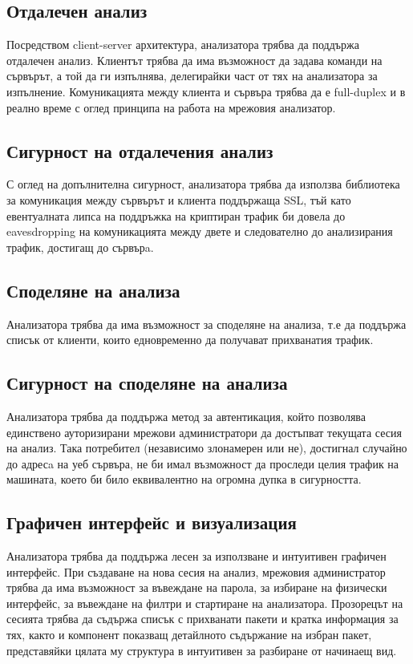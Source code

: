 \documentclass[12pt,a4paper,oneside]{book}
\begin{document}
\subsection{Отдалечен анализ}

Посредством client-server архитектура, анализатора трябва да поддържа отдалечен
анализ. Клиентът трябва да има възможност да задава команди на сървърът, а той
да ги изпълнява, делегирайки част от тях на анализатора за изпълнение.
Комуникацията между клиента и сървъра трябва да е full-duplex и в реално време с
оглед принципа на работа на мрежовия анализатор.

\subsection{Сигурност на отдалечения анализ}

С оглед на допълнителна сигурност, анализатора трябва да използва библиотека за
комуникация между сървърът и клиента поддържаща SSL, тъй като евентуалната липса
на поддръжка на криптиран трафик би довела до eavesdropping на комуникацията
между двете и следователно до анализирания трафик, достигащ до сървърa.

\subsection{Споделяне на анализа}

Анализатора трябва да има възможност за споделяне на анализа, т.е да поддържа
списък от клиенти, които едновременно да получават прихванатия трафик. 

\subsection{Сигурност на споделяне на анализа}

Анализатора трябва да поддържа метод за автентикация, който позволява единствено
ауторизирани мрежови администратори да достъпват текущата сесия на
анализ. Така потребител (независимо злонамерен или не), достигнал случайно до
адресa на уеб сървъра, не би имал възможност да проследи целия трафик на
машината, което би било еквивалентно на огромна дупка в сигурността.

\subsection{Графичен интерфейс и визуализация}

Анализатора трябва да поддържа лесен за използване и интуитивен графичен
интерфейс. При създаване на нова сесия на анализ, мрежовия администратор трябва
да има възможност за въвеждане на парола, за избиране на физически интерфейс, за
въвеждане на филтри и стартиране на анализатора. Прозорецът на сесията трябва да
съдържа списък с прихванати пакети и кратка информация за тях, както и
компонент показващ детайлното съдържание на избран пакет, представяйки цялата му
структура в интуитивен за разбиране от начинаещ вид.
\end{document}
